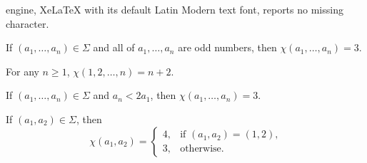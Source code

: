 \documentclass[10pt,a4paper]{amsart}
\begin{document}
engine, XeLaTeX with its default Latin Modern text font, reports no missing character.
\begin{corollary}\label{cor:odd} If $(a_1, \dots, a_n)\in \Sigma$ and all of $a_1, \dots, a_n$ are odd numbers, then $\chi(a_1,\dots, a_n)=3$.
\end{corollary}

\begin{corollary}\label{cor:1ton} For any $n\geq 1$, $\chi(1, 2,\dots, n)=n+2$.
\end{corollary}

\begin{theorem}\label{thm:2a1} If $(a_1, \dots, a_n)\in \Sigma$ and $a_n<2a_1$, then $\chi(a_1,\dots, a_n)=3$.
\end{theorem}

\begin{theorem}\label{thm:pair} If $(a_1, a_2)\in \Sigma$, then
$$ \chi(a_1, a_2)=\left\{\begin{array}{ll}4, & \mbox{if $(a_1, a_2)=(1,2)$,} \\3, & \mbox{otherwise.}\end{array}\right. $$
\end{theorem}
\end{document}

